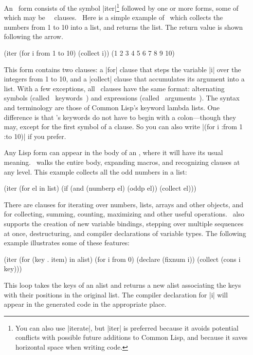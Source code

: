 An \iter\ form consists of the symbol |iter|\footnote{You can also use
|iterate|, but |iter| is preferred because it avoids potential conflicts with
possible future additions to Common Lisp, and because it saves
horizontal space when writing code.}
followed by one or more
forms, some of which may be \iter\
~clauses.~  Here is a simple example of \iter\ which collects the
numbers from 1 to 10 into a list, and returns the list.  The return
value is shown following the arrow.
\begin{program}
(iter (for i from 1 to 10)
      (collect i))          \yields (1 2 3 4 5 6 7 8 9 10)
\end{program}
This form contains two clauses: a |for| clause that steps the
variable |i| over the integers from 1 to 10, and a |collect|
clause that accumulates its argument into a list.  With a few
exceptions, all \iter\ clauses have the same format: alternating
symbols (called ~keywords~) and expressions (called
~arguments~).  The syntax and terminology are those of Common
Lisp's keyword lambda lists.  One difference is that \iter's keywords
do not have to begin with a colon---though they may, except for the
first symbol of a clause.  So you can also write  |(for i :from
1 :to 10)| if you prefer.

Any Lisp form can appear in the body of an \iter, where it will have
its usual meaning.  \iter\ walks the entire body, expanding macros,
and recognizing clauses at any level.  This example collects all the
odd numbers in a list:
\begin{program}
(iter (for el in list)
      (if (and (numberp el) (oddp el))
          (collect el)))
\end{program}

There are clauses for iterating over numbers, lists, arrays and other
objects, and for
collecting, summing, counting, maximizing and other useful operations.
\iter\ also supports the creation of new variable bindings, stepping
over multiple sequences at once, destructuring, and compiler
declarations of variable types.  The following example illustrates
some of these features:
\begin{program}
(iter (for (key . item) in alist)
         (for i from 0)
         (declare (fixnum i))
         (collect (cons i key)))
\end{program}

This loop takes the keys of an alist and returns a new alist
associating the keys with their positions in the original list. The
compiler declaration for |i| will appear in the generated code
in the appropriate place.

